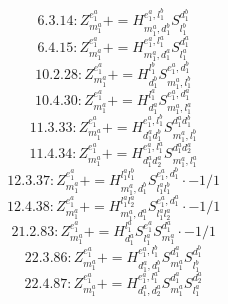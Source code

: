 \documentclass[letterpaper,10pt,fleqn,leqno,onecolumn]{article}
\begin{document}
\begin{equation} \;\;\;\;\;\;  6.3.14: Z^{e_{1}^{a}}_{m_{1}^{a}}+=H^{e_{1}^{a},l_{1}^{b}}_{m_{1}^{a},d_{1}^{b}}S^{d_{1}^{b}}_{l_{1}^{b}} \end{equation}
\begin{equation} \;\;\;\;\;\;  6.4.15: Z^{e_{1}^{a}}_{m_{1}^{a}}+=H^{e_{1}^{a},l_{1}^{a}}_{m_{1}^{a},d_{1}^{a}}S^{d_{1}^{a}}_{l_{1}^{a}} \end{equation}
\begin{equation} \;\;\;\;\;\;  10.2.28: Z^{e_{1}^{a}}_{m_{1}^{a}}+=H^{l_{1}^{b}}_{d_{1}^{b}}S^{e_{1}^{a},d_{1}^{b}}_{m_{1}^{a},l_{1}^{b}} \end{equation}
\begin{equation} \;\;\;\;\;\;  10.4.30: Z^{e_{1}^{a}}_{m_{1}^{a}}+=H^{l_{1}^{a}}_{d_{1}^{a}}S^{e_{1}^{a},d_{1}^{a}}_{m_{1}^{a},l_{1}^{a}} \end{equation}
\begin{equation} \;\;\;\;\;\;  11.3.33: Z^{e_{1}^{a}}_{m_{1}^{a}}+=H^{e_{1}^{a},l_{1}^{b}}_{d_{1}^{a}d_{1}^{b}}S^{d_{1}^{a}d_{1}^{b}}_{m_{1}^{a},l_{1}^{b}} \end{equation}
\begin{equation} \;\;\;\;\;\;  11.4.34: Z^{e_{1}^{a}}_{m_{1}^{a}}+=H^{e_{1}^{a},l_{1}^{a}}_{d_{1}^{a}d_{2}^{a}}S^{d_{1}^{a}d_{2}^{a}}_{m_{1}^{a},l_{1}^{a}} \end{equation}
\begin{equation} \;\;\;\;\;\;  12.3.37: Z^{e_{1}^{a}}_{m_{1}^{a}}+=H^{l_{1}^{a}l_{1}^{b}}_{m_{1}^{a},d_{1}^{b}}S^{e_{1}^{a},d_{1}^{b}}_{l_{1}^{a}l_{1}^{b}}\cdot -1/1 \end{equation}
\begin{equation} \;\;\;\;\;\;  12.4.38: Z^{e_{1}^{a}}_{m_{1}^{a}}+=H^{l_{1}^{a}l_{2}^{a}}_{m_{1}^{a},d_{1}^{a}}S^{e_{1}^{a},d_{1}^{a}}_{l_{1}^{a}l_{2}^{a}}\cdot -1/1 \end{equation}
\begin{equation} \;\;\;\;\;\;  21.2.83: Z^{e_{1}^{a}}_{m_{1}^{a}}+=H^{l_{1}^{a}}_{d_{1}^{a}}S^{e_{1}^{a}}_{l_{1}^{a}}S^{d_{1}^{a}}_{m_{1}^{a}}\cdot -1/1 \end{equation}
\begin{equation} \;\;\;\;\;\;  22.3.86: Z^{e_{1}^{a}}_{m_{1}^{a}}+=H^{e_{1}^{a},l_{1}^{b}}_{d_{1}^{a},d_{1}^{b}}S^{d_{1}^{a}}_{m_{1}^{a}}S^{d_{1}^{b}}_{l_{1}^{b}} \end{equation}
\begin{equation} \;\;\;\;\;\;  22.4.87: Z^{e_{1}^{a}}_{m_{1}^{a}}+=H^{e_{1}^{a},l_{1}^{a}}_{d_{1}^{a},d_{2}^{a}}S^{d_{1}^{a}}_{m_{1}^{a}}S^{d_{2}^{a}}_{l_{1}^{a}} \end{equation}
\end{document}
